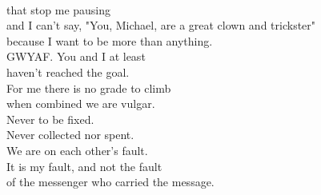 \documentclass[smalldemyvopaper,11pt,twoside,onecolumn,openright,extrafontsizes]{memoir}
\begin{document}
\\that stop me pausing
\\and I can't say, "You, Michael, are a great clown and trickster"
\\because I want to be more than anything.
\\GWYAF. You and I at least
\\haven't reached the goal.
\\For me there is no grade to climb
\\when combined we are vulgar.
\\Never to be fixed.
\\Never collected nor spent.
\\We are on each other's fault.
\\It is my fault, and not the fault
\\of the messenger who carried the message.
\end{document}
